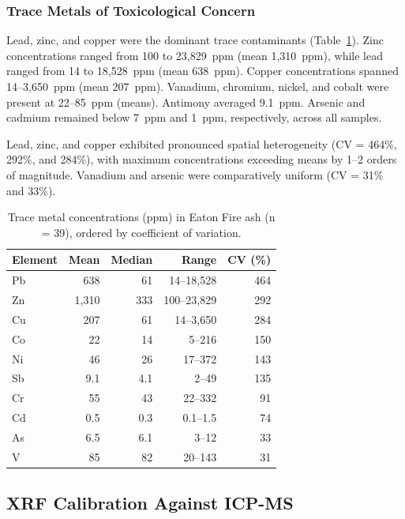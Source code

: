 \documentclass[12pt,letterpaper]{article}
\begin{document}
\subsubsection{Trace Metals of Toxicological Concern}

Lead, zinc, and copper were the dominant trace contaminants (Table~\ref{tab:trace_metals}). Zinc concentrations ranged from 100 to 23,829~ppm (mean 1,310~ppm), while lead ranged from 14 to 18,528~ppm (mean 638~ppm). Copper concentrations spanned 14--3,650~ppm (mean 207~ppm). Vanadium, chromium, nickel, and cobalt were present at 22--85~ppm (means). Antimony averaged 9.1~ppm. Arsenic and cadmium remained below 7~ppm and 1~ppm, respectively, across all samples.

Lead, zinc, and copper exhibited pronounced spatial heterogeneity (CV = 464\%, 292\%, and 284\%), with maximum concentrations exceeding means by 1--2 orders of magnitude. Vanadium and arsenic were comparatively uniform (CV = 31\% and 33\%).

\begin{table}[htbp]
\centering
\caption{Trace metal concentrations (ppm) in Eaton Fire ash (n = 39), ordered by coefficient of variation.}
\label{tab:trace_metals}
\begin{tabular}{lrrrr}
\toprule
Element & Mean & Median & Range & CV (\%) \\
\midrule
Pb & 638 & 61 & 14--18,528 & 464 \\
Zn & 1,310 & 333 & 100--23,829 & 292 \\
Cu & 207 & 61 & 14--3,650 & 284 \\
Co & 22 & 14 & 5--216 & 150 \\
Ni & 46 & 26 & 17--372 & 143 \\
Sb & 9.1 & 4.1 & 2--49 & 135 \\
Cr & 55 & 43 & 22--332 & 91 \\
Cd & 0.5 & 0.3 & 0.1--1.5 & 74 \\
As & 6.5 & 6.1 & 3--12 & 33 \\
V & 85 & 82 & 20--143 & 31 \\
\bottomrule
\end{tabular}
\end{table}

\subsection{XRF Calibration Against ICP-MS}
\end{document}

